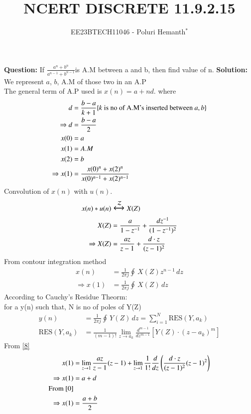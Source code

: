 \documentclass[journal,12pt,twocolumn]{IEEEtran}
\theoremstyle{remark}
\begin{document}

\vspace{3cm}


\title{NCERT DISCRETE 11.9.2.15}
\author{EE23BTECH11046 - Poluri Hemanth$^{*}$}
\maketitle
\textbf{Question:}
If \( \frac{a^n +b^n}{a^{n-1} + b^{n-1}}\)is A.M between a and b, then find value of n.
\break
\textbf{Solution:}
We represent $a$, $b$, A.M of those two in an A.P\\
The general term of A.P used is $x(n)=a+nd$. where
\begin{align}
	\notag d&=\frac{b-a}{k+1}\{k\text{ is no of A.M's inserted between }a ,b\}\\
	\Rightarrow d&=\frac{b-a}{2}\label{0}\\
	x(0)&=a\label{a}\\
	x(1)&=A.M\\
	x(2)&=b\label{b}\\
	\Rightarrow x(1)&=\frac{x(0)^n +x(2)^n}{x(0)^{n-1} + x(2)^{n-1}}\label{r} 
\end{align}
Convolution of $x(n)$ with $u(n)$.
\begin{align}
	x(n)*u(n)&\Large\xleftrightarrow{\mathcal{Z}}X(Z)\\
	X(Z)&=\frac{a}{1-z^{-1}}+\frac{dz^{-1}}{(1-z^{-1})^2}\\
	\Rightarrow X(Z)&=\frac{az}{z-1}+\frac{d\cdot z}{(z-1)^2}\label{8}
\end{align}
From contour integration method
\begin{align}
	x(n)&=\frac{1}{2\pi j}\oint\,X(Z)z^{n-1}\,dz\\
	\Rightarrow x(1)&=\frac{1}{2\pi j}\oint\,X(Z)\,dz
\end{align}
According to Cauchy's Residue Theorm:\\
for a y(n) such that, N is no of poles of Y(Z)\\
\begin{align}
	y(n)&=\frac{1}{2\pi j}\oint\,Y(Z)\,dz=\sum\limits_{i=1}^N\text{RES}(Y,a_k)\\
	\text{RES}(Y,a_k)&=\frac{1}{(m-1)!}\lim_{z\to a_k}\frac{d^{m-1}}{dz^{m-1}}[Y(Z)\cdot(z-a_k)^{m}]
\end{align}
From \eqref{8}
\begin{align}	
	x(1)&=\lim_{z\to1}\frac{az}{z-1}(z-1)+\lim_{z\to1}\frac{1}{1!}\frac{d}{dz}\left(\frac{d\cdot z}{(z-1)^2}(z-1)^2\right)\\
	\Rightarrow x(1)&=a+d\\
	\notag\text{From \eqref{0}}\\
	\Rightarrow x(1)&=\frac{a+b}{2}\label{1}
\end{align}
\end{document}
